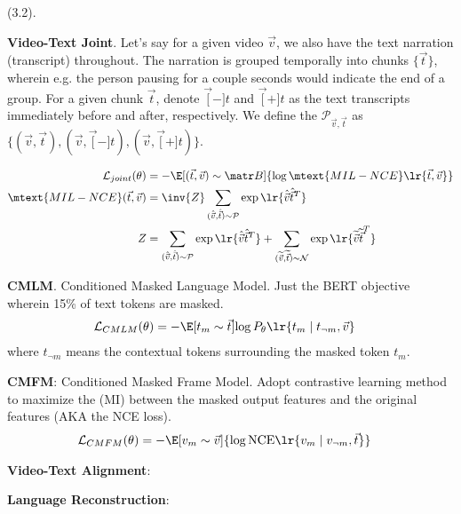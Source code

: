 \documentclass[11pt]{article}
\begin{document}
 (3.2).
\begin{compactitem}
	\item \textbf{Video-Text Joint}. Let's say for a given video $\vec v$, we also have the text narration (transcript) throughout. The narration is grouped temporally into chunks $\{\vec{t} \}$, wherein e.g. the person pausing for a couple seconds would indicate the end of a group. For a given chunk $\vec t$, denote $\vec[-]{t}$ and $\vec[+]{t}$ as the text transcripts immediately before and after, respectively. We define the  $\mathcal{P}_{\vec v, \vec t}$ as $ \{  (\vec v, \vec t), (\vec v, \vec[-]{t}), (\vec v, \vec[+]{t})  \}  $. 
	
	\begin{align}
		\mathcal{L}_{joint}(\theta) 
			&= -\E[(\vec t, \vec v) \sim \matr B]{ \log \mtext{MIL-NCE}\lr{\vec t, \vec v}  } \\
		 \mtext{MIL-NCE}(\vec t, \vec v)
		 	&= \inv{Z} \sum_{  (\hat{\vec v}, \hat{\vec t} ) \sim \mathcal{P} } \exp\lr{ \hat{\vec v}  \hat{\vec t}^T } \\
		 Z 
		 	&= \sum_{  (\hat{\vec v}, \hat{\vec t} ) \sim \mathcal{P} } \exp\lr{ \hat{\vec v}  \hat{\vec t}^T }
		 	 + \sum_{  (\widetilde{\vec v}, \widetilde{\vec t} ) \sim \mathcal{N} } \exp\lr{ \widetilde{\vec v}  \widetilde{\vec t}^T }
	\end{align}
	
	\item \textbf{CMLM}. Conditioned Masked Language Model. Just the BERT objective wherein 15\% of text tokens are masked. 
	\begin{align}
		\mathcal{L}_{CMLM}(\theta)
			&= -\E[t_{m} \sim \vec t]{\log P_{\theta}\lr{ t_m \mid t_{\neg m}, \vec v }}
	\end{align}
	where $t_{\neg m}$ means the contextual tokens surrounding the masked token $t_m$.
	
	\item \textbf{CMFM}: Conditioned Masked Frame Model. Adopt contrastive learning method to maximize the  (MI) between the masked output features and the original features (AKA the NCE loss). 
	\begin{align}
		\mathcal{L}_{CMFM}(\theta)
			&= -\E[v_m \sim \vec v]{\log \text{NCE}\lr{v_m \mid v_{\neg m}, \vec t}}
	\end{align}
	
	\item \textbf{Video-Text Alignment}: 
	
	\item \textbf{Language Reconstruction}: 
\end{compactitem}
\end{document}

